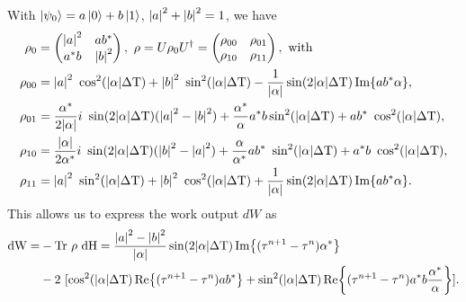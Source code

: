 With $\ket{\psi_0} = a \ket{0} + b \ket{1}$,  $\abs{a}^2 + \abs{b}^2 = 1$, we  have
\begin{align}
	\rho_0 & = \begin{pmatrix}
	\abs{a}^2 & a b ^* \\
	a^* b & \abs{b}^2 \\
	\end{pmatrix}, \ \rho = U \rho_0 U^\dagger = 
	\begin{pmatrix}
	\rho_{00} & \rho_{01} \\
	\rho_{10} & \rho_{11} \\
	\end{pmatrix},  \ \text{with} \nonumber \\
	\rho_{00} & = \abs{a}^2 \ \cos^2(\abs{\alpha} \Delta \mathrm{T}) + \abs{b}^2 \ \sin^2(\abs{\alpha} \Delta \mathrm{T}) - \frac{1}{\abs{\alpha}} \sin(2 \abs{\alpha} \Delta \mathrm{T}) \Im{a b^* \alpha}, \nonumber \\
	\rho_{01} & = \frac{\alpha^*}{2 \abs{\alpha}} i \ \sin(2 \abs{\alpha} \Delta \mathrm{T}) (\abs{a}^2 - \abs{b}^2) + \frac{\alpha^*}{\alpha} a^* b \sin^2(\abs{\alpha} \Delta \mathrm{T}) + a b^* \ \cos^2(\abs{\alpha} \Delta \mathrm{T}), \nonumber \\
	\rho_{10} & = 	\frac{\abs{\alpha}}{2 \alpha^*} i \ \sin(2 \abs{\alpha} \Delta \mathrm{T}) (\abs{b}^2 - \abs{a}^2) + \frac{\alpha}{\alpha^*} a b^* \ \sin^2(\abs{\alpha} \Delta \mathrm{T}) + a^* b \ \cos^2(\abs{\alpha} \Delta \mathrm{T}), \nonumber \\
	\rho_{11} & = \abs{a}^2 \ \sin^2(\abs{\alpha} \Delta \mathrm{T}) + \abs{b}^2 \ \cos^2(\abs{\alpha} \Delta \mathrm{T}) + \frac{1}{\abs{\alpha}} \sin(2 \abs{\alpha} \Delta \mathrm{T}) \Im{a b^* \alpha}. \nonumber
\end{align}
	This allows us to express the work output $dW$ as
\begin{align}
	\mathrm{dW} = & - \mathrm{Tr} \ \rho \ \mathrm{dH} = \frac{\abs{a}^2 - \abs{b}^2}{\abs{\alpha}} \sin(2 \abs{\alpha} \Delta \mathrm{T}) \Im{(\tau^{n+1} - \tau^n) \alpha^*} \nonumber \\
	& - 2 \ [\cos^2(\abs{\alpha} \Delta \mathrm{T}) \Re{(\tau^{n+1} - \tau^n) a b^*} 
	+ \sin^2(\abs{\alpha} \Delta \mathrm{T}) \Re{(\tau^{n+1} - \tau^n)a^* b \frac{\alpha^*}{\alpha}} ]. \label{dwformula}
\end{align}